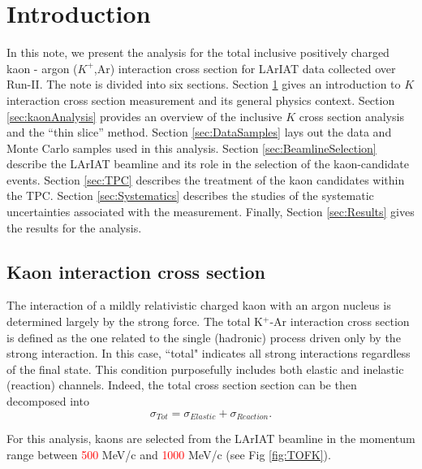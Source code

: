 \section{Introduction}\label{sec:Introduction}
In this note, we present the analysis for the total inclusive positively charged kaon - argon ($K^{+}$,Ar) interaction cross section for LArIAT data collected over Run-II. The note is divided into six sections. Section \ref{sec:Introduction} gives an introduction to $K$ interaction cross section measurement and its general physics context. Section \ref{sec:kaonAnalysis} provides an overview of the inclusive $K$ cross section analysis and the ``thin slice'' method. Section \ref{sec:DataSamples} lays out the data and Monte Carlo samples used in this analysis.  Section \ref{sec:BeamlineSelection} describe the LArIAT beamline and its role in the selection of the kaon-candidate events. Section \ref{sec:TPC} describes the treatment of the kaon candidates within the TPC.
Section \ref{sec:Systematics} describes the studies of the systematic uncertainties associated with the measurement. Finally, Section \ref{sec:Results} gives the results for the analysis. 

\subsection{Kaon interaction cross section}\label{sec:KCrossSection}
The interaction of a mildly relativistic charged kaon with an argon nucleus is determined largely by the strong force. The total K$^{+}$-Ar interaction cross section is defined as the one related to the single (hadronic) process driven only by the strong interaction.
In this case, ``total" indicates all strong interactions regardless of the final state. This condition purposefully includes both elastic and inelastic (reaction) channels. Indeed, the total cross section section can be then decomposed into
$$\sigma_{Tot} = \sigma_{Elastic}+ \sigma_{Reaction}.$$

For this analysis, kaons are selected from the LArIAT beamline in the momentum range between \textcolor{red}{500} MeV/c and \textcolor{red}{1000} MeV/c (see Fig \ref{fig:TOFK}).

